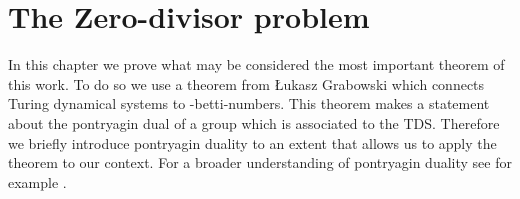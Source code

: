 \section{The Zero-divisor problem}
\label{the_zero_divisor_problem}

In this chapter we prove what may be considered the most important theorem of this work.
To do so we use a theorem from \L{}ukasz Grabowski which connects Turing dynamical systems to \ltwo-betti-numbers.
This theorem makes a statement about the pontryagin dual of a group which is associated to the TDS.
Therefore we briefly introduce pontryagin duality to an extent that allows us to apply the theorem to our context.
For a broader understanding of pontryagin duality see for example \cite{fol95}.




